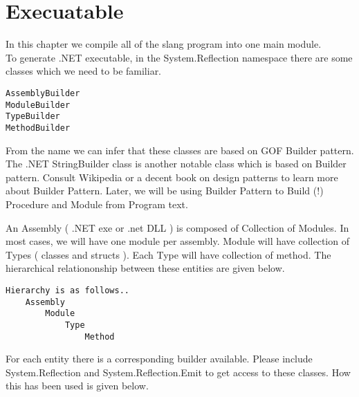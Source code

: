 \section{Execuatable}
In this chapter we compile all of the slang program into one main module.\\
To generate .NET executable, in the System.Reflection namespace there are some classes which we
need to be familiar.
\begin{verbatim}
AssemblyBuilder
ModuleBuilder
TypeBuilder
MethodBuilder
\end{verbatim}

From the name we can infer that these classes are based on GOF Builder pattern. The .NET StringBuilder class is another
notable class which is based on Builder pattern. Consult Wikipedia or a decent book on design patterns to learn more about
Builder Pattern. Later, we will be using Builder Pattern to Build (!) Procedure and Module from Program text.

An Assembly ( .NET exe or .net DLL ) is composed of Collection of Modules. In most cases, we will have one module per
assembly. Module will have collection of Types ( classes and structs ). Each Type will have collection of method. The
hierarchical relationonship between these entities are given below.

\begin{verbatim}
Hierarchy is as follows..
	Assembly
		Module
			Type
				Method
\end{verbatim}

For each entity there is a corresponding builder available. Please include System.Reflection and System.Reflection.Emit to
get access to these classes. How this has been used is given below.

